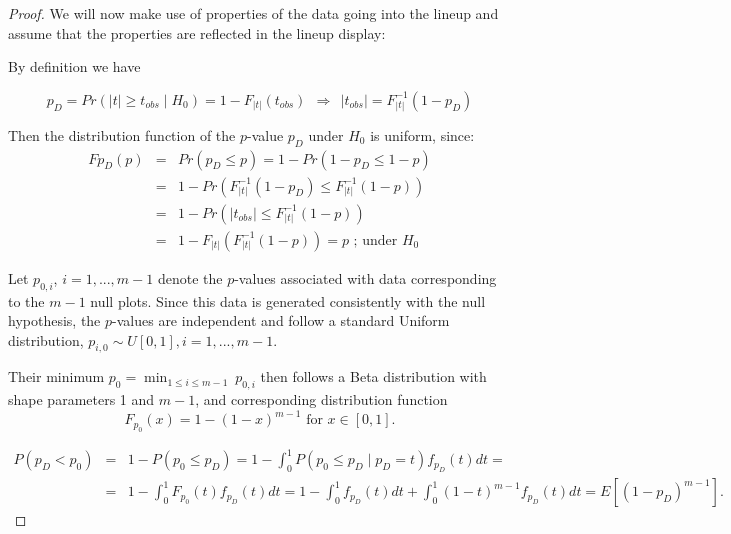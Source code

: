 \documentclass{article}
\newcommand{\hh}[1]{{\color{orange} #1}} %
\begin{document}
\begin{proof}
We will now make use of properties of the data going into the lineup and assume that the properties are reflected in the lineup display:

 By definition we have 

$$p_D=Pr\left(|t| \ge t_{obs} \mid H_0\right)=1-F_{|t|}(t_{obs}) \ \ \Rightarrow \ \  |t_{obs}|=F_{|t|}^{-1}(1-p_D)$$

Then the distribution function of the $p$-value $p_D$ under $H_0$ is uniform, since:  
\begin{eqnarray}\label{dist_p}
F{p_D}(p) &=& Pr(p_D \le p)=1-Pr(1-p_D \le 1-p) \nonumber \\
  &=& 1-Pr\left(F_{|t|}^{-1}(1-p_D) \le F_{|t|}^{-1}(1-p) \right) \nonumber \\
  &=& 1-Pr\left(|t_{obs}| \le F_{|t|}^{-1}(1-p)\right) \nonumber \\
  &=&%
          1-F_{|t|}\left( F_{|t|}^{-1}(1-p)\right)=p \mbox{ ; under $H_0$} 
\end{eqnarray}




Let $p_{0,i}$, $i=1, ..., m-1$ denote the  $p$-values associated with data corresponding to the $m-1$ null plots. Since this data is generated consistently with the null hypothesis,  the $p$-values are independent and  follow a standard Uniform distribution, $p_{i,0} \sim U[0,1], i= 1, ..., m-1$.

\hh{Their minimum $p_0 = \min_{1 \le i \le m-1}  \ p_{0,i}$ then follows a Beta distribution with shape parameters 1 and $m-1$, and corresponding distribution function 
\[
F_{p_0} (x) =  1- (1- x) ^{m-1}  \text{ for } x \in [0,1].
\]

\begin{eqnarray*}
P(p_D < p_{0}) &=& 1 - P(p_{0} \le p_D) = 1- \int_0^1  P(p_{0} \le p_D \mid p_D=t) f_{p_D}(t) dt =  \\
&=& 1 - \int_0^1 F_{p_{0}}(t) f_{p_D}(t) dt = 1 - \int_0^1 f_{p_D}(t) dt + \int_0^1 (1-t)^{m-1} f_{p_D}(t) dt =  E\left[ (1 - p_D)^{m-1}\right].
\end{eqnarray*}


}
\end{proof}
\end{document}
